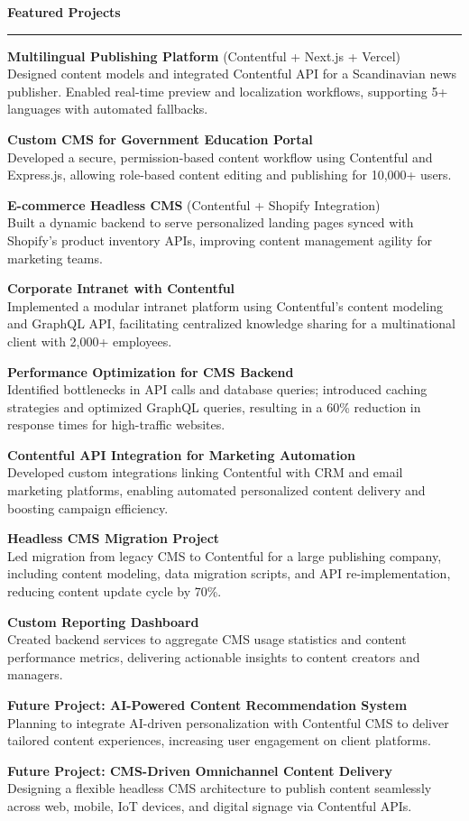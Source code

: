 \documentclass[a4paper,10pt]{article}
\newcommand{\sectiontitle}[1]{\vspace{6pt}\noindent\textbf{\large #1}\vspace{3pt}\hrule\vspace{6pt}}
\newenvironment{smallprojects}{
	\begingroup
	\small
	\setlength{\parskip}{3pt}
}{
	\endgroup
}
\begin{document}
	
	\sectiontitle{Featured Projects}
	\begin{smallprojects}
		\textbf{Multilingual Publishing Platform} (Contentful + Next.js + Vercel) \\
		Designed content models and integrated Contentful API for a Scandinavian news publisher. Enabled real-time preview and localization workflows, supporting 5+ languages with automated fallbacks.
		
		\textbf{Custom CMS for Government Education Portal} \\
		Developed a secure, permission-based content workflow using Contentful and Express.js, allowing role-based content editing and publishing for 10,000+ users.
		
		\textbf{E-commerce Headless CMS} (Contentful + Shopify Integration) \\
		Built a dynamic backend to serve personalized landing pages synced with Shopify’s product inventory APIs, improving content management agility for marketing teams.
		
		\textbf{Corporate Intranet with Contentful} \\
		Implemented a modular intranet platform using Contentful’s content modeling and GraphQL API, facilitating centralized knowledge sharing for a multinational client with 2,000+ employees.
		
		\textbf{Performance Optimization for CMS Backend} \\
		Identified bottlenecks in API calls and database queries; introduced caching strategies and optimized GraphQL queries, resulting in a 60\% reduction in response times for high-traffic websites.
		
		\textbf{Contentful API Integration for Marketing Automation} \\
		Developed custom integrations linking Contentful with CRM and email marketing platforms, enabling automated personalized content delivery and boosting campaign efficiency.
		
		\textbf{Headless CMS Migration Project} \\
		Led migration from legacy CMS to Contentful for a large publishing company, including content modeling, data migration scripts, and API re-implementation, reducing content update cycle by 70\%.
		
		\textbf{Custom Reporting Dashboard} \\
		Created backend services to aggregate CMS usage statistics and content performance metrics, delivering actionable insights to content creators and managers.
		
		\textbf{Future Project: AI-Powered Content Recommendation System} \\
		Planning to integrate AI-driven personalization with Contentful CMS to deliver tailored content experiences, increasing user engagement on client platforms.
		
		\textbf{Future Project: CMS-Driven Omnichannel Content Delivery} \\
		Designing a flexible headless CMS architecture to publish content seamlessly across web, mobile, IoT devices, and digital signage via Contentful APIs.
	\end{smallprojects}
	
\end{document}
